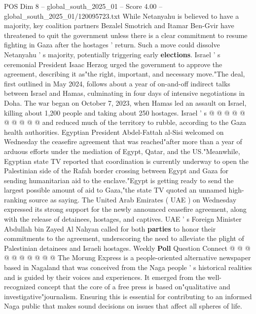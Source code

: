 \begin{textsample}{POS Dim 8 – global\_south\_2025\_01 – Score 4.00 – global\_south\_2025\_01/120095723.txt}
While Netanyahu is believed to have a majority, key coalition partners Bezalel Smotrich and Itamar Ben-Gvir have threatened to quit the government unless there is a clear commitment to resume fighting in Gaza after the hostages ' return.
Such a move could dissolve Netanyahu ' s majority, potentially triggering early \textbf{elections}.
Israel ' s ceremonial President Isaac Herzog urged the government to approve the agreement, describing it as"the right, important, and necessary move."The deal, first outlined in May 2024, follows about a year of on-and-off indirect talks between Israel and Hamas, culminating in four days of intensive negotiations in Doha.
The war began on October 7, 2023, when Hamas led an assault on Israel, killing about 1,200 people and taking about 250 hostages.
Israel ' s @ @ @ @ @ @ @ @ @ @ and reduced much of the territory to rubble, according to the Gaza health authorities.
Egyptian President Abdel-Fattah al-Sisi welcomed on Wednesday the ceasefire agreement that was reached"after more than a year of arduous efforts under the mediation of Egypt, Qatar, and the US."Meanwhile, Egyptian state TV reported that coordination is currently underway to open the Palestinian side of the Rafah border crossing between Egypt and Gaza for sending humanitarian aid to the enclave."Egypt is getting ready to send the largest possible amount of aid to Gaza,"the state TV quoted an unnamed high-ranking source as saying.
The United Arab Emirates ( UAE ) on Wednesday expressed its strong support for the newly announced ceasefire agreement, along with the release of detainees, hostages, and captives.
UAE ' s Foreign Minister Abdullah bin Zayed Al Nahyan called for both \textbf{parties} to honor their commitments to the agreement, underscoring the need to alleviate the plight of Palestinian detainees and Israeli hostages.
Weekly \textbf{Poll} Question Connect @ @ @ @ @ @ @ @ @ @ The Morung Express is a people-oriented alternative newspaper based in Nagaland that was conceived from the Naga people ' s historical realities and is guided by their voices and experiences.
It emerged from the well-recognized concept that the core of a free press is based on"qualitative and investigative"journalism.
Ensuring this is essential for contributing to an informed Naga public that makes sound decisions on issues that affect all spheres of life.

\end{textsample}
